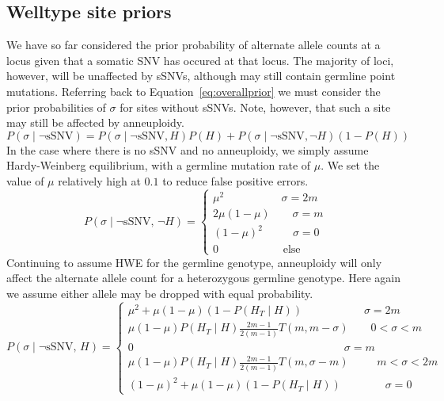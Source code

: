 \documentclass[../main.tex]{subfiles}
\begin{document}
\subsection{Welltype site priors}
We have so far considered the prior probability of alternate allele counts at a locus given that a somatic SNV has occured at that locus. The majority of loci, however, will be unaffected by sSNVs, although may still contain germline point mutations. Referring back to Equation~\eqref{eq:overallprior} we must consider the prior probabilities of $\sigma$ for sites without sSNVs. Note, however, that such a site may still be affected by anneuploidy.
\begin{equation}
P(\sigma\mid\neg\text{sSNV})=P(\sigma\mid\neg\text{sSNV},H)P(H)+P(\sigma\mid\neg\text{sSNV},\neg H)(1-P(H))
\end{equation} 
In the case where there is no sSNV and no anneuploidy, we simply assume Hardy-Weinberg equilibrium, with a germline mutation rate of $\mu$. We set the value of $\mu$ relatively high at $0.1$ to reduce false positive errors.
\begin{equation*}
P(\sigma\mid\neg\text{sSNV},\,\neg H) = \begin{cases} \mu^2\qquad\qquad\quad\,\sigma=2m\\ 2\mu(1-\mu) \qquad \sigma = m \\ (1-\mu)^2 \qquad \; \;\, \sigma=0 \\ 0 \qquad\qquad\quad\;\;\; \text{else} \end{cases}
\end{equation*}
Continuing to assume HWE for the germline genotype, anneuploidy will only affect the alternate allele count for a heterozygous germline genotype. Here again we assume either allele may be dropped with equal probability.
\begin{equation*}
P(\sigma\mid\neg\text{sSNV},\, H) = \begin{cases} \mu^2 + \mu(1-\mu)(1-P(H_T\mid H))\qquad\qquad\quad\;\; \sigma=2m\\
\mu(1-\mu)P(H_T\mid H)\frac{2m-1}{2(m-1)}T(m,m-\sigma) \qquad 0<\sigma<m\\
0 \qquad\qquad\qquad\qquad\qquad\qquad\qquad\qquad\qquad\quad \sigma=m \\
\mu(1-\mu)P(H_T\mid H)\frac{2m-1}{2(m-1)}T(m,\sigma-m) \qquad\;\; m<\sigma<2m\\
(1-\mu)^2 + \mu(1-\mu)(1-P(H_T\mid H)) \qquad\qquad \sigma=0 \end{cases}
\end{equation*}
\end{document}

